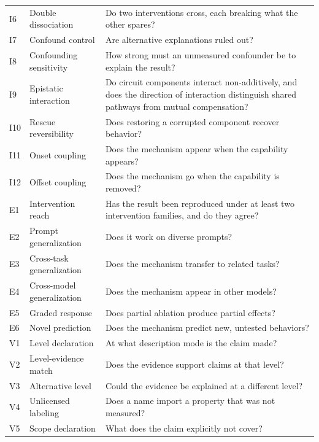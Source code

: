 \documentclass{article}
\begin{document}
\begin{table}[H]
\begin{tabular}{@{}llp{8.5cm}@{}}
I6 & Double dissociation & Do two interventions cross, each breaking what the other spares? \\
I7 & Confound control & Are alternative explanations ruled out? \\
I8 & Confounding sensitivity & How strong must an unmeasured confounder be to explain the result? \\
I9 & Epistatic interaction & Do circuit components interact non-additively, and does the direction of interaction distinguish shared pathways from mutual compensation? \\
I10 & Rescue reversibility & Does restoring a corrupted component recover behavior? \\
I11 & Onset coupling & Does the mechanism appear when the capability appears? \\
\midrule
I12 & Offset coupling & Does the mechanism go when the capability is removed? \\
\midrule
E1 & Intervention reach & Has the result been reproduced under at least two intervention families, and do they agree? \\
E2 & Prompt generalization & Does it work on diverse prompts? \\
E3 & Cross-task generalization & Does the mechanism transfer to related tasks? \\
E4 & Cross-model generalization & Does the mechanism appear in other models? \\
E5 & Graded response & Does partial ablation produce partial effects? \\
E6 & Novel prediction & Does the mechanism predict new, untested behaviors? \\
\midrule
V1 & Level declaration & At what description mode is the claim made? \\
V2 & Level-evidence match & Does the evidence support claims at that level? \\
V3 & Alternative level & Could the evidence be explained at a different level? \\
V4 & Unlicensed labeling & Does a name import a property that was not measured? \\
V5 & Scope declaration & What does the claim explicitly not cover? \\
\bottomrule
\end{tabular}
\end{table}
\endgroup
\end{document}
